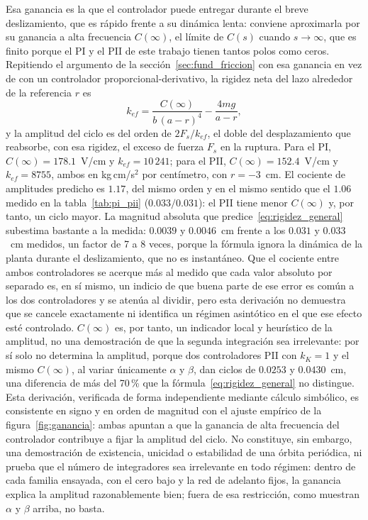 Esa ganancia es la que el controlador puede entregar durante el breve deslizamiento, que es rápido frente a su dinámica lenta: conviene aproximarla por su ganancia a alta frecuencia $C(\infty)$, el límite de $C(s)$ cuando $s\to\infty$, que es finito porque el PI y el PII de este trabajo tienen tantos polos como ceros. Repitiendo el argumento de la sección~\ref{sec:fund_friccion} con esa ganancia en vez de con un controlador proporcional-derivativo, la rigidez neta del lazo alrededor de la referencia $r$ es
\begin{equation}
k_{ef} = \frac{C(\infty)}{b\,(a-r)^4} - \frac{4mg}{a-r} ,
\label{eq:rigidez_general}
\end{equation}
y la amplitud del ciclo es del orden de $2F_s/k_{ef}$, el doble del desplazamiento que reabsorbe, con esa rigidez, el exceso de fuerza $F_s$ en la ruptura. Para el PI, $C(\infty)=178.1$~V/cm y $k_{ef}=10\,241$; para el PII, $C(\infty)=152.4$~V/cm y $k_{ef}=8755$, ambos en kg\,cm/s$^2$ por centímetro, con $r=-3$~cm. El cociente de amplitudes predicho es $1.17$, del mismo orden y en el mismo sentido que el $1.06$ medido en la tabla~\ref{tab:pi_pii} ($0.033/0.031$): el PII tiene menor $C(\infty)$ y, por tanto, un ciclo mayor. La magnitud absoluta que predice~\eqref{eq:rigidez_general} subestima bastante a la medida: $0.0039$ y $0.0046$~cm frente a los $0.031$ y $0.033$~cm medidos, un factor de 7 a 8 veces, porque la fórmula ignora la dinámica de la planta durante el deslizamiento, que no es instantáneo. Que el cociente entre ambos controladores se acerque más al medido que cada valor absoluto por separado es, en sí mismo, un indicio de que buena parte de ese error es común a los dos controladores y se atenúa al dividir, pero esta derivación no demuestra que se cancele exactamente ni identifica un régimen asintótico en el que ese efecto esté controlado. $C(\infty)$ es, por tanto, un indicador local y heurístico de la amplitud, no una demostración de que la segunda integración sea irrelevante: por sí solo no determina la amplitud, porque dos controladores PII con $k_K=1$ y el mismo $C(\infty)$, al variar únicamente $\alpha$ y $\beta$, dan ciclos de $0.0253$ y $0.0430$~cm, una diferencia de más del 70\,\% que la fórmula~\eqref{eq:rigidez_general} no distingue. Esta derivación, verificada de forma independiente mediante cálculo simbólico, es consistente en signo y en orden de magnitud con el ajuste empírico de la figura~\ref{fig:ganancia}: ambas apuntan a que la ganancia de alta frecuencia del controlador contribuye a fijar la amplitud del ciclo. No constituye, sin embargo, una demostración de existencia, unicidad o estabilidad de una órbita periódica, ni prueba que el número de integradores sea irrelevante en todo régimen: dentro de cada familia ensayada, con el cero bajo y la red de adelanto fijos, la ganancia explica la amplitud razonablemente bien; fuera de esa restricción, como muestran $\alpha$ y $\beta$ arriba, no basta.

